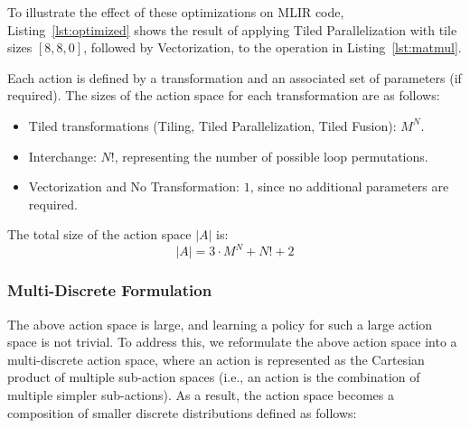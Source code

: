 \documentclass[10pt,twocolumn]{article}
\begin{document}
To illustrate the effect of these optimizations on MLIR code, Listing~\ref{lst:optimized} shows the result of applying Tiled Parallelization with tile sizes $[8, 8, 0]$, followed by Vectorization, to the operation in Listing~\ref{lst:matmul}.

Each action is defined by a transformation and an associated set of parameters (if required). The sizes of the action space for each transformation are as follows:

\begin{itemize}
\item Tiled transformations (Tiling, Tiled Parallelization, Tiled Fusion): $M^N$.
\item Interchange: $N!$, representing the number of possible loop permutations.
\item Vectorization and No Transformation: $1$, since no additional parameters are required.
\end{itemize}

The total size of the action space $|A|$ is:
\begin{equation}
|A| = 3 \cdot M^N + N! + 2
\end{equation}

\subsubsection{Multi-Discrete Formulation}
The above action space is large, and learning a policy for such a large action space is not trivial. To address this, we reformulate the above action space into a multi-discrete action space, where an action is represented as the Cartesian product of multiple sub-action spaces (i.e., an action is the combination of multiple simpler sub-actions). As a result, the action space becomes a composition of smaller discrete distributions defined as follows:
\end{document}
